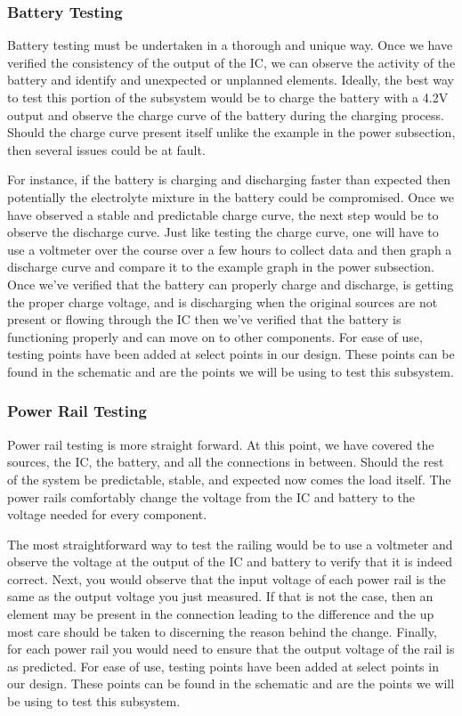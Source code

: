 \subsubsection{Battery Testing}
Battery testing must be undertaken in a thorough and unique way. Once we have verified the consistency of the output of the IC, we can observe the activity of the battery and identify and unexpected or unplanned elements. Ideally, the best way to test this portion of the subsystem would be to charge the battery with a 4.2V output and observe the charge curve of the battery during the charging process. Should the charge curve present itself unlike the example in the power subsection, then several issues could be at fault. 

For instance, if the battery is charging and discharging faster than expected then potentially the electrolyte mixture in the battery could be compromised. Once we have observed a stable and predictable charge curve, the next step would be to observe the discharge curve. Just like testing the charge curve, one will have to use a voltmeter over the course over a few hours to collect data and then graph a discharge curve and compare it to the example graph in the power subsection. Once we've verified that the battery can properly charge and discharge, is getting the proper charge voltage, and is discharging when the original sources are not present or flowing through the IC then we've verified that the battery is functioning properly and can move on to other components. For ease of use, testing points have been added at select points in our design. These points can be found in the schematic and are the points we will be using to test this subsystem.

\subsubsection{Power Rail Testing}
Power rail testing is more straight forward. At this point, we have covered the sources, the IC, the battery, and all the connections in between. Should the rest of the system be predictable, stable, and expected now comes the load itself. The power rails comfortably change the voltage from the IC and battery to the voltage needed for every component. 

The most straightforward way to test the railing would be to use a voltmeter and observe the voltage at the output of the IC and battery to verify that it is indeed correct.
Next, you would observe that the input voltage of each power rail is the same as the output voltage you just measured. If that is not the case, then an element may be present in the connection leading to the difference and the up most care should be taken to discerning the reason behind the change. Finally, for each power rail you would need to ensure that the output voltage of the rail is as predicted. For ease of use, testing points have been added at select points in our design. These points can be found in the schematic and are the points we will be using to test this subsystem.

